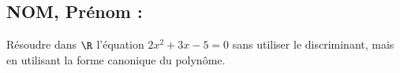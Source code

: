 \documentclass[a4paper,11pt,exos]{nsi}
\begin{document}
\subsection*{NOM, Prénom : \dotfill} 


\maketitle




\begin{exercice}%
    Résoudre dans $\R$ l'équation $2x^2+3x-5=0$ sans utiliser le discriminant, mais en utilisant la forme canonique du polynôme.
    
\end{exercice}

\end{document}
